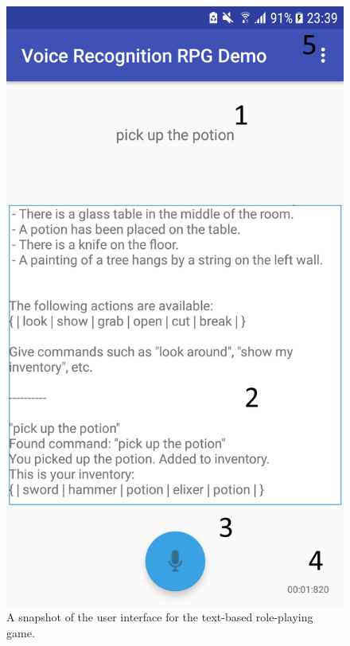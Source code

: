 \documentclass[12pt]{article}
\begin{document}
\begin{center}
\begin{figure}
\begin{center}
  \includegraphics[scale=0.4]{Screenshot_20180519-233930.png}
  \caption{A snapshot of the user interface for the text-based role-playing game.}
  \label{fig:snapshot-ui}
  \end{center}
\end{figure}
\end{center}
\end{document}

